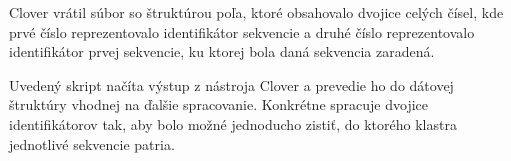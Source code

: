 Clover vrátil súbor so štruktúrou poľa, ktoré obsahovalo dvojice celých čísel, kde prvé číslo reprezentovalo identifikátor sekvencie a druhé číslo reprezentovalo identifikátor prvej sekvencie, ku ktorej bola daná sekvencia zaradená.

Uvedený skript načíta výstup z nástroja Clover a prevedie ho do dátovej štruktúry vhodnej na
ďalšie spracovanie. Konkrétne spracuje dvojice identifikátorov tak, aby bolo možné jednoducho
zistiť, do ktorého klastra jednotlivé sekvencie patria.

